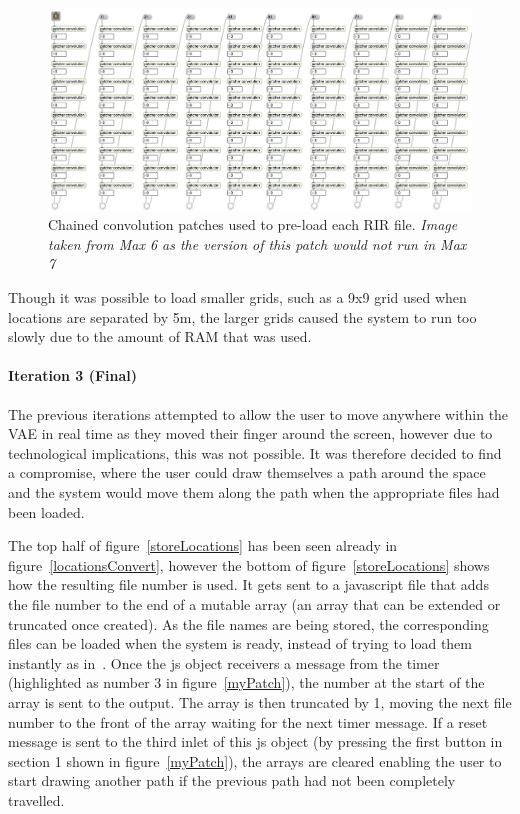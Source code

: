 \documentclass[../../main.tex]{subfiles}
\begin{document}
			\begin{figure}[H]
				\centerline{\includegraphics[scale = 0.4]{Sections/Implementation/Max/images/Max/Iteration2/preload.png}}
				\caption{Chained convolution patches used to pre-load each \ac{RIR} file. \textit{Image taken from Max 6 as the version of this patch would not run in Max 7}}
				\label{preload}
			\end{figure}


			Though it was possible to load smaller grids, such as a 9x9 grid used when locations are separated by 5m, the larger grids caused the system to run too slowly due to the amount of RAM that was used.

		 \paragraph{Iteration 3 (Final)}
		 \label{iteration3}

		 	The previous iterations attempted to allow the user to move anywhere within the \ac{VAE} in real time as they moved their finger around the screen, however due to technological implications, this was not possible. It was therefore decided to find a compromise, where the user could draw themselves a path around the space and the system would move them along the path when the appropriate files had been loaded.

		 	The top half of figure~\ref{storeLocations} has been seen already in figure~\ref{locationsConvert}, however the bottom of figure~\ref{storeLocations} shows how the resulting file number is used. It gets sent to a javascript file that adds the file number to the end of a mutable array (an array that can be extended or truncated once created). As the file names are being stored, the corresponding files can be loaded when the system is ready, instead of trying to load them instantly as in~. Once the js object receivers a message from the timer (highlighted as number 3 in figure~\ref{myPatch}), the number at the start of the array is sent to the output. The array is then truncated by 1, moving the next file number to the front of the array waiting for the next timer message. If a reset message is sent to the third inlet of this js object (by pressing the first button in section 1 shown in figure~\ref{myPatch}), the arrays are cleared enabling the user to start drawing another path if the previous path had not been completely travelled.
\end{document}
